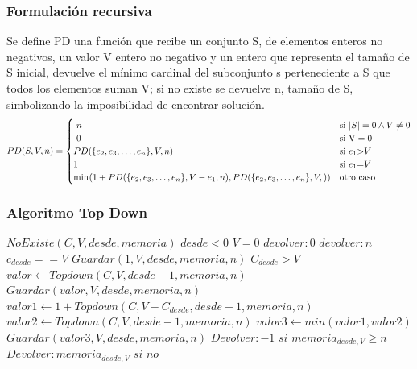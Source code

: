 \documentclass[7pt,a4paper]{article}
\begin{document}
\bigskip
\subsubsection{Formulación recursiva}
Se define PD una función que recibe un conjunto S, de elementos enteros no negativos, un valor V entero no negativo y un entero que representa el tamaño de S inicial, devuelve el mínimo cardinal del subconjunto s perteneciente a S que todos los elementos suman V; si no existe se devuelve n, tamaño de S, simbolizando la imposibilidad de encontrar solución. \\
\[
\begin{array}{@{} r @{} c @{} l @{} }
&PD(S, V, n)&{}=\displaystyle
\begin{cases}
\ n &\text{si } \text |S| = 0 \wedge V \neq 0 
\\
\ 0 &\text{si } \text V = 0 
\\
PD($\{$e_{2},e_{3},\dots,e_{n}$\}$,V,n)  &\text{si } e_{1} $>$ V
\\
1 &\text{si } e_{1} $=$ V
\\
\min_{} (1 + PD($\{$e_{2},e_{3},\dots,e_{n}$\}$, V - e_{1}, n),PD($\{$e_{2},e_{3},\dots,e_{n}$\}$, V, ))&\text{otro caso }
\\
\end{cases}
\end{array}
\]


\subsubsection{Algoritmo Top Down}

\begin{codebox}
  \li \If $NoExiste(C,V,desde,memoria)$ \Then
  \li \If $desde < 0$ \Then
  	\li \If $V =0$ \Then 
  	\li $devolver:0$
  	\li \Else
  	\li $devolver:n$
  \End
  \End
\li \If $c_{desde}==V$ \Then
	\li	$Guardar(1,V,desde,memoria,n)$
	\li \Else
\li \If $C_{desde} > V$ \Then  
		\li $valor \gets Topdown(C,V,desde-1,memoria,n)$
		\li $Guardar(valor, V, desde, memoria,n)$
		\li \Else
		\li $valor1 \gets 1 + Topdown(C,V-C_{desde},desde-1,memoria,n)$
		\li $valor2 \gets Topdown(C,V,desde-1,memoria,n) $
		\li $valor3 \gets min(valor1,valor2)$ 
		\li $Guardar(valor3,V,desde,memoria,n)$	
  		\End
  \End
  \li $Devolver: -1$  $si$ $memoria_{desde,V} \geq n$
\li $Devolver: memoria_{desde,V}$ $si$ $no$

\end{codebox}
\end{document}
